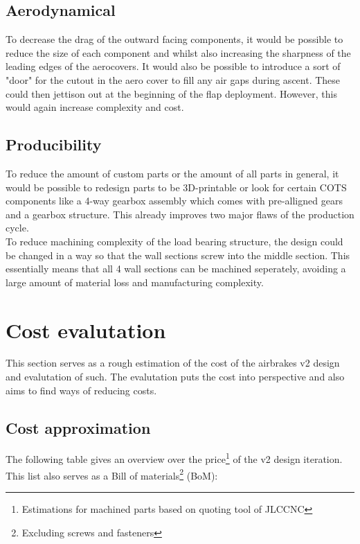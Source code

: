 \documentclass[fontsize=11pt,%
twoside,%
BCOR          = 8mm, %
DIV           = 11,  %
titlepage     = off,%
index=totoc,%
xcolor        = pdftex,%
dvipsnames,%
bibliography  = totoc,%
bibliography = numbered, %
listof        = notnumbered]{scrreprt}
\begin{document}
\subsection{Aerodynamical}
To decrease the drag of the outward facing components, it would be possible to reduce the size of each component and whilst also increasing the sharpness of the leading edges of the aerocovers. It would also be possible to introduce a sort of "door" for the cutout in the aero cover to fill any air gaps during ascent. These could then jettison out at the beginning of the flap deployment. However, this would again increase complexity and cost.

\subsection{Producibility}
To reduce the amount of custom parts or the amount of all parts in general, it would be possible to redesign parts to be 3D-printable or look for certain COTS components like a 4-way gearbox assembly which comes with pre-alligned gears and a gearbox structure. This already improves two major flaws of the production cycle.\\
To reduce machining complexity of the load bearing structure, the design could be changed in a way so that the wall sections screw into the middle section. This essentially means that all 4 wall sections can be machined seperately, avoiding a large amount of material loss and manufacturing complexity.\\

\newpage

\section{Cost evalutation}
This section serves as a rough estimation of the cost of the airbrakes v2 design and evalutation of such. The evalutation puts the cost into perspective and also aims to find ways of reducing costs.

\subsection{Cost approximation}
The following table gives an overview over the price\footnote{Estimations for machined parts based on quoting tool of JLCCNC} of the v2 design iteration. This list also serves as a Bill of materials\footnote{Excluding screws and fasteners} (BoM):
\end{document}
